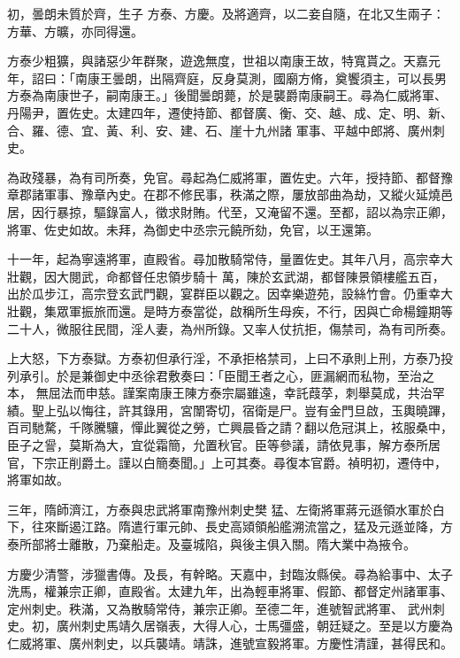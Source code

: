 \begin{pinyinscope}
 初，曇朗未質於齊，生子
 方泰、方慶。及將適齊，以二妾自隨，在北又生兩子：方華、方曠，亦同得還。



 方泰少粗獷，與諸惡少年群聚，遊逸無度，世祖以南康王故，特寬貰之。天嘉元年，詔曰：「南康王曇朗，出隔齊庭，反身莫測，國廟方脩，奠饗須主，可以長男方泰為南康世子，嗣南康王。」後聞曇朗薨，於是襲爵南康嗣王。尋為仁威將軍、丹陽尹，置佐史。太建四年，遷使持節、都督廣、衡、交、越、成、定、明、新、合、羅、德、宜、黃、利、安、建、石、崖十九州諸
 軍事、平越中郎將、廣州刺史。



 為政殘暴，為有司所奏，免官。尋起為仁威將軍，置佐史。六年，授持節、都督豫章郡諸軍事、豫章內史。在郡不修民事，秩滿之際，屢放部曲為劫，又縱火延燒邑居，因行暴掠，驅錄富人，徵求財賄。代至，又淹留不還。至都，詔以為宗正卿，將軍、佐史如故。未拜，為御史中丞宗元饒所劾，免官，以王還第。



 十一年，起為寧遠將軍，直殿省。尋加散騎常侍，量置佐史。其年八月，高宗幸大壯觀，因大閱武，命都督任忠領步騎十
 萬，陳於玄武湖，都督陳景領樓艦五百，出於瓜步江，高宗登玄武門觀，宴群臣以觀之。因幸樂遊苑，設絲竹會。仍重幸大壯觀，集眾軍振旅而還。是時方泰當從，啟稱所生母疾，不行，因與亡命楊鐘期等二十人，微服往民間，淫人妻，為州所錄。又率人仗抗拒，傷禁司，為有司所奏。



 上大怒，下方泰獄。方泰初但承行淫，不承拒格禁司，上曰不承則上刑，方泰乃投列承引。於是兼御史中丞徐君敷奏曰：「臣聞王者之心，匪漏網而私物，至治之本，
 無屈法而申慈。謹案南康王陳方泰宗屬雖遠，幸託葭莩，刺舉莫成，共治罕績。聖上弘以悔往，許其錄用，宮闈寄切，宿衛是尸。豈有金門旦啟，玉輿曉蹕，百司馳騖，千隊騰驤，憚此翼從之勞，亡興晨昏之請？翻以危冠淇上，袨服桑中，臣子之諐，莫斯為大，宜從霜簡，允置秋官。臣等參議，請依見事，解方泰所居官，下宗正削爵土。謹以白簡奏聞。」上可其奏。尋復本官爵。禎明初，遷侍中，將軍如故。



 三年，隋師濟江，方泰與忠武將軍南豫州刺史樊
 猛、左衛將軍蔣元遜領水軍於白下，往來斷遏江路。隋遣行軍元帥、長史高熲領船艦溯流當之，猛及元遜並降，方泰所部將士離散，乃棄船走。及臺城陷，與後主俱入關。隋大業中為掖令。



 方慶少清警，涉獵書傳。及長，有幹略。天嘉中，封臨汝縣侯。尋為給事中、太子洗馬，權兼宗正卿，直殿省。太建九年，出為輕車將軍、假節、都督定州諸軍事、定州刺史。秩滿，又為散騎常侍，兼宗正卿。至德二年，進號智武將軍、
 武州刺史。初，廣州刺史馬靖久居嶺表，大得人心，士馬彊盛，朝廷疑之。至是以方慶為仁威將軍、廣州刺史，以兵襲靖。靖誅，進號宣毅將軍。方慶性清謹，甚得民和。




\end{pinyinscope}
